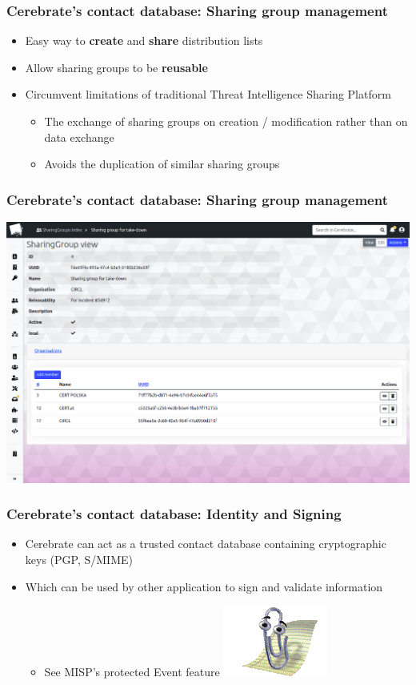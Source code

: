 \begin{frame}
\frametitle{Cerebrate's contact database: Sharing group management}
    \begin{itemize}
        \item Easy way to \textbf{create} and \textbf{share} distribution lists
        \item Allow sharing groups to be \textbf{reusable}
        \item Circumvent limitations of traditional Threat Intelligence Sharing Platform
        \begin{itemize}
            \item The exchange of sharing groups on creation / modification rather than on data exchange
            \item Avoids the duplication of similar sharing groups
        \end{itemize}
    \end{itemize}
\end{frame}

\begin{frame}
\frametitle{Cerebrate's contact database: Sharing group management}
    \begin{center}
        \includegraphics[width=0.9\linewidth]{pictures/sharinggroup.png}
    \end{center}
\end{frame}

\begin{frame}
\frametitle{Cerebrate's contact database: Identity and Signing}
    \begin{itemize}
        \item Cerebrate can act as a trusted contact database containing cryptographic keys (PGP, S/MIME)
        \item Which can be used by other application to sign and validate information
        \begin{itemize}
            \item See MISP's protected Event feature \includegraphics[width=0.09\linewidth]{pictures/clippy-solo.png}
        \end{itemize}
    \end{itemize}
\end{frame}

